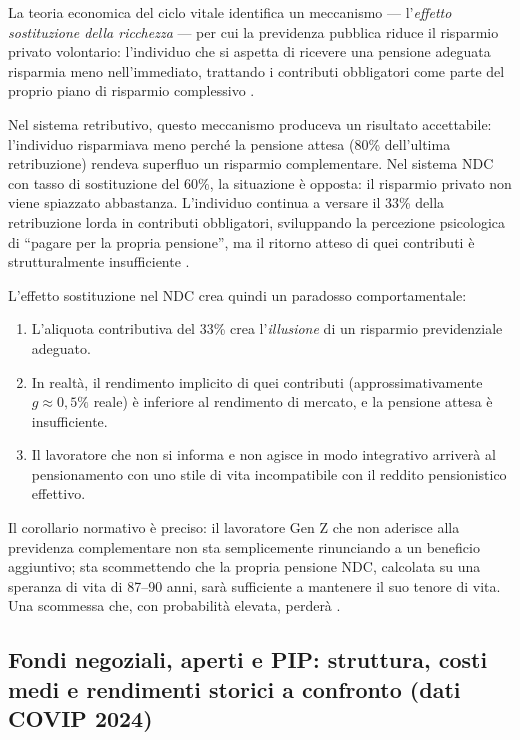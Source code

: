 \noindent
La teoria economica del ciclo vitale identifica un meccanismo —
l'\emph{effetto sostituzione della ricchezza} — per cui la previdenza
pubblica riduce il risparmio privato volontario: l'individuo che
si aspetta di ricevere una pensione adeguata risparmia meno nell'immediato,
trattando i contributi obbligatori come parte del proprio piano
di risparmio complessivo \cite[cap.~12]{RosenGayerRapallini2023}.

\medskip
\noindent
Nel sistema retributivo, questo meccanismo produceva un risultato
accettabile: l'individuo risparmiava meno perché la pensione attesa
(80\% dell'ultima retribuzione) rendeva superfluo un risparmio
complementare.
Nel sistema NDC con tasso di sostituzione del 60\%, la situazione
è opposta: il risparmio privato non viene spiazzato abbastanza.
L'individuo continua a versare il 33\% della retribuzione lorda
in contributi obbligatori, sviluppando la percezione psicologica di
``pagare per la propria pensione'', ma il ritorno atteso di quei
contributi è strutturalmente insufficiente \cite{Bosi2018, RosenGayerRapallini2023}.

\medskip
\noindent
L'effetto sostituzione nel NDC crea quindi un paradosso comportamentale:
\begin{enumerate}
    \item L'aliquota contributiva del 33\% crea l'\emph{illusione}
          di un risparmio previdenziale adeguato.
    \item In realtà, il rendimento implicito di quei contributi
          (approssimativamente $g \approx 0{,}5\%$ reale) è inferiore
          al rendimento di mercato, e la pensione attesa è insufficiente.
    \item Il lavoratore che non si informa e non agisce in modo
          integrativo arriverà al pensionamento con uno stile di vita
          incompatibile con il reddito pensionistico effettivo.
\end{enumerate}

\medskip
\noindent
Il corollario normativo è preciso: il lavoratore Gen Z che non aderisce
alla previdenza complementare non sta semplicemente rinunciando a un
beneficio aggiuntivo; sta scommettendo che la propria pensione NDC,
calcolata su una speranza di vita di 87--90 anni, sarà sufficiente a
mantenere il suo tenore di vita.
Una scommessa che, con probabilità elevata, perderà \cite{Fornero2018}.

\subsection{Fondi negoziali, aperti e PIP:
            struttura, costi medi e rendimenti storici
            a confronto (dati COVIP 2024)}
\label{sub:tipologie}

